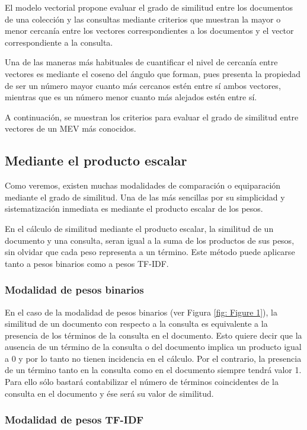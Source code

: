 \documentclass[titlepage]{article}
\begin{document}
	El modelo vectorial propone evaluar el grado de similitud entre los documentos de una colección y las consultas mediante criterios que muestran la mayor o menor cercanía entre los vectores correspondientes a los documentos y el vector correspondiente a la consulta. 
	
	Una de las maneras más habituales de cuantificar el nivel de cercanía entre vectores es mediante el coseno del ángulo que forman, pues presenta la propiedad de ser un número mayor cuanto más cercanos estén entre sí ambos vectores, mientras que es un número menor cuanto más alejados estén entre sí.
	
	A continuación, se muestran los criterios para evaluar el grado de similitud entre vectores de un MEV más conocidos.
	
	\subsection{Mediante el producto escalar}
	
	Como veremos, existen muchas modalidades de comparación o equiparación mediante el grado de similitud. Una de las más sencillas por su simplicidad y sistematización inmediata es mediante el producto escalar de los pesos.
	
	En el cálculo de similitud mediante el producto escalar, la similitud de un documento y una consulta, seran igual a la suma de los productos de sus pesos, sin olvidar que cada peso representa a un término. Este método puede aplicarse tanto a pesos binarios como a pesos TF-IDF.
	
	\subsubsection{Modalidad de pesos binarios}
	
	En el caso de la modalidad de pesos binarios (ver Figura \ref{fig: Figure 1}), la similitud de un documento con respecto a la consulta es equivalente a la presencia de los términos de la consulta en el documento. Esto quiere decir que la ausencia de un término de la consulta o del documento implica un producto igual a 0 y por lo tanto no tienen incidencia en el cálculo. Por el contrario, la presencia de un término tanto en la consulta como en el documento siempre tendrá valor 1. Para ello sólo bastará contabilizar el número de términos coincidentes de la consulta en el documento y ése será su valor de similitud.
	
	\subsubsection{Modalidad de pesos TF-IDF}
	
\end{document}
